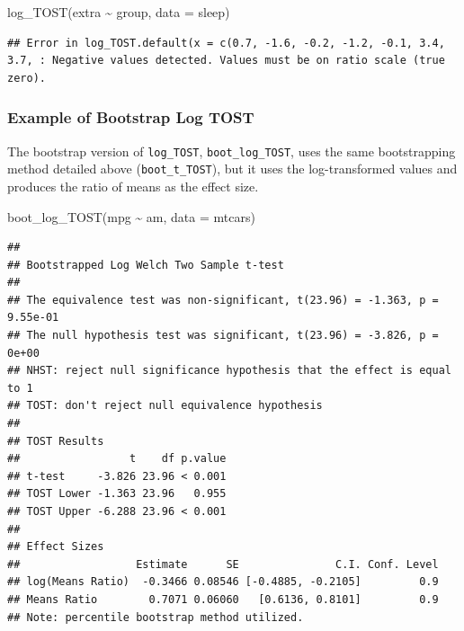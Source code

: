 \documentclass[]{interact}
\theoremstyle{plain}%
\theoremstyle{definition}
\theoremstyle{remark}
\newenvironment{Shaded}{\begin{snugshade}}{\end{snugshade}}
\newcommand{\AttributeTok}[1]{\textcolor[rgb]{0.77,0.63,0.00}{#1}}
\newcommand{\FunctionTok}[1]{\textcolor[rgb]{0.00,0.00,0.00}{#1}}
\newcommand{\NormalTok}[1]{#1}
\newcommand{\SpecialCharTok}[1]{\textcolor[rgb]{0.00,0.00,0.00}{#1}}
\begin{document}
\begin{Shaded}
\begin{Highlighting}[]
\FunctionTok{log\_TOST}\NormalTok{(extra }\SpecialCharTok{\textasciitilde{}}\NormalTok{ group, }\AttributeTok{data =}\NormalTok{ sleep)}
\end{Highlighting}
\end{Shaded}

\begin{verbatim}
## Error in log_TOST.default(x = c(0.7, -1.6, -0.2, -1.2, -0.1, 3.4, 3.7, : Negative values detected. Values must be on ratio scale (true zero).
\end{verbatim}

\newpage

\hypertarget{example-of-bootstrap-log-tost}{%
\subsubsection{Example of Bootstrap Log
TOST}\label{example-of-bootstrap-log-tost}}

The bootstrap version of \texttt{log\_TOST}, \texttt{boot\_log\_TOST},
uses the same bootstrapping method detailed above
(\texttt{boot\_t\_TOST}), but it uses the log-transformed values and
produces the ratio of means as the effect size.

\begin{Shaded}
\begin{Highlighting}[]
\FunctionTok{boot\_log\_TOST}\NormalTok{(mpg }\SpecialCharTok{\textasciitilde{}}\NormalTok{ am, }\AttributeTok{data =}\NormalTok{ mtcars)}
\end{Highlighting}
\end{Shaded}

\begin{verbatim}
## 
## Bootstrapped Log Welch Two Sample t-test
## 
## The equivalence test was non-significant, t(23.96) = -1.363, p = 9.55e-01
## The null hypothesis test was significant, t(23.96) = -3.826, p = 0e+00
## NHST: reject null significance hypothesis that the effect is equal to 1 
## TOST: don't reject null equivalence hypothesis
## 
## TOST Results 
##                 t    df p.value
## t-test     -3.826 23.96 < 0.001
## TOST Lower -1.363 23.96   0.955
## TOST Upper -6.288 23.96 < 0.001
## 
## Effect Sizes 
##                  Estimate      SE               C.I. Conf. Level
## log(Means Ratio)  -0.3466 0.08546 [-0.4885, -0.2105]         0.9
## Means Ratio        0.7071 0.06060   [0.6136, 0.8101]         0.9
## Note: percentile bootstrap method utilized.
\end{verbatim}
\end{document}
